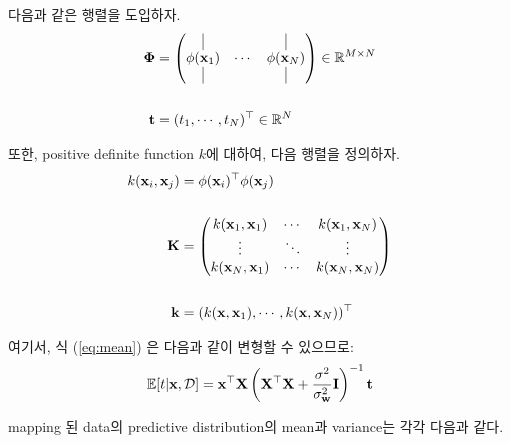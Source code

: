 \documentclass{article} %
\begin{document}
다음과 같은 행렬을 도입하자.
\begin{equation}
\begin{aligned}
	\boldsymbol{\Phi} &= \begin{pmatrix}
		\vrule & & \vrule \\
		\phi({\bf x}_1) & \cdots & \phi({\bf x}_N) \\
		\vrule & & \vrule
	\end{pmatrix} \in \mathbb{R}^{M \times N} \\\\
	{\bf t} &= (t_1, \cdots, t_N)^\top \in \mathbb{R}^{N}
\end{aligned}
\end{equation}

또한, positive definite function $k$에 대하여, 다음 행렬을 정의하자.
\begin{equation}
\begin{aligned}
	k({\bf x}_i, {\bf x}_j) &= \phi({\bf x}_i)^\top \phi({\bf x}_j)
	\\\\
	{\bf K} &= \begin{pmatrix}
		k({\bf x}_1, {\bf x}_1) & \cdots & k({\bf x}_1, {\bf x}_N) \\
		\vdots & \ddots & \vdots \\
		k({\bf x}_N, {\bf x}_1) & \cdots & k({\bf x}_N, {\bf x}_N)
	\end{pmatrix} \\\\
	{\bf k} &= (k({\bf x}, {\bf x}_1), \cdots, k({\bf x}, {\bf x}_N))^\top 
\end{aligned}
\end{equation}

여기서, 식 (\ref{eq:mean}) 은 다음과 같이 변형할 수 있으므로:
\begin{equation}
	\mathbb{E}[t | {\bf x}, {\cal D}] = {\bf x}^\top {\bf X} \left(
	{\bf X}^\top{\bf X} + \dfrac{\sigma^2}{\sigma^2_{\bf w}} {\bf I}
	\right)^{-1} {\bf t}
	\label{eq:mean2}
\end{equation}

mapping 된 data의 predictive distribution의 mean과 variance는 각각 다음과 같다.
\end{document}
